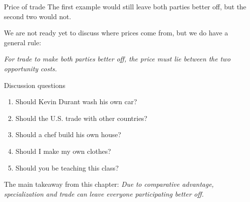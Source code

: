 \documentclass[compress]{beamer}
\begin{document}
\begin{frame}{Price of trade}
    The first example would still leave both parties better off, but the second two would not.

    \medskip

    We are not ready yet to discuss where prices come from, but we do have a general rule:

    \begin{center}
        \textit{For trade to make both parties better off, the price must lie between the two opportunity costs.}
    \end{center}

\end{frame}

\begin{frame}{Discussion questions}

\begin{enumerate}
    \item Should Kevin Durant wash his own car?
    \item Should the U.S. trade with other countries?
    \item Should a chef build his own house?
    \item Should I make my own clothes?
    \item Should you be teaching this class?
\end{enumerate}

    \medskip

    \begin{block}{The main takeaway from this chapter:}
        \textit{Due to comparative advantage, specialization and trade can leave everyone participating better off.}
    \end{block}

\end{frame} 
\end{document}
